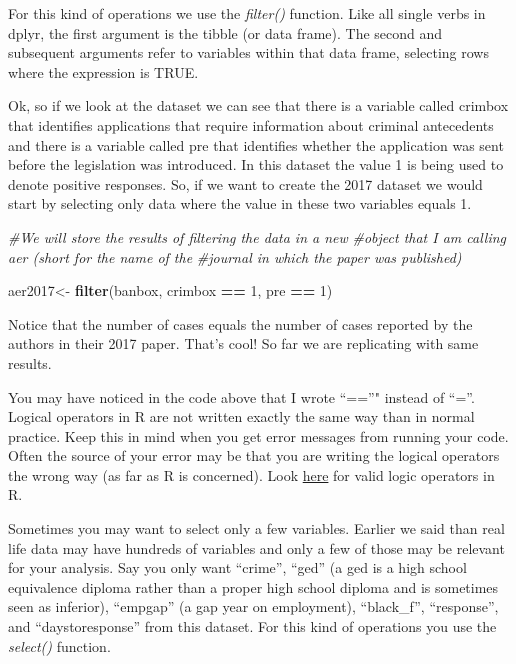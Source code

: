 \documentclass[]{book}
\newenvironment{Shaded}{\begin{snugshade}}{\end{snugshade}}
\newcommand{\CommentTok}[1]{\textcolor[rgb]{0.56,0.35,0.01}{\textit{#1}}}
\newcommand{\DecValTok}[1]{\textcolor[rgb]{0.00,0.00,0.81}{#1}}
\newcommand{\KeywordTok}[1]{\textcolor[rgb]{0.13,0.29,0.53}{\textbf{#1}}}
\newcommand{\NormalTok}[1]{#1}
\newcommand{\OperatorTok}[1]{\textcolor[rgb]{0.81,0.36,0.00}{\textbf{#1}}}
\newcommand{\StringTok}[1]{\textcolor[rgb]{0.31,0.60,0.02}{#1}}
\theoremstyle{definition}
\theoremstyle{definition}
\theoremstyle{definition}
\theoremstyle{remark}
\begin{document}
For this kind of operations we use the \emph{filter()} function. Like
all single verbs in dplyr, the first argument is the tibble (or data
frame). The second and subsequent arguments refer to variables within
that data frame, selecting rows where the expression is TRUE.

Ok, so if we look at the dataset we can see that there is a variable
called crimbox that identifies applications that require information
about criminal antecedents and there is a variable called pre that
identifies whether the application was sent before the legislation was
introduced. In this dataset the value 1 is being used to denote positive
responses. So, if we want to create the 2017 dataset we would start by
selecting only data where the value in these two variables equals 1.

\begin{Shaded}
\begin{Highlighting}[]
\CommentTok{#We will store the results of filtering the data in a new }
\CommentTok{#object that I am calling aer (short for the name of the }
\CommentTok{#journal in which the paper was published)}

\NormalTok{aer2017<-}\StringTok{ }\KeywordTok{filter}\NormalTok{(banbox, crimbox }\OperatorTok{==}\StringTok{ }\DecValTok{1}\NormalTok{, pre }\OperatorTok{==}\StringTok{ }\DecValTok{1}\NormalTok{)}
\end{Highlighting}
\end{Shaded}

Notice that the number of cases equals the number of cases reported by
the authors in their 2017 paper. That's cool! So far we are replicating
with same results.

You may have noticed in the code above that I wrote ``==''" instead of
``=''. Logical operators in R are not written exactly the same way than
in normal practice. Keep this in mind when you get error messages from
running your code. Often the source of your error may be that you are
writing the logical operators the wrong way (as far as R is concerned).
Look \href{https://www.statmethods.net/management/operators.html}{here}
for valid logic operators in R.

Sometimes you may want to select only a few variables. Earlier we said
than real life data may have hundreds of variables and only a few of
those may be relevant for your analysis. Say you only want ``crime'',
``ged'' (a ged is a high school equivalence diploma rather than a proper
high school diploma and is sometimes seen as inferior), ``empgap'' (a
gap year on employment), ``black\_f'', ``response'', and
``daystoresponse'' from this dataset. For this kind of operations you
use the \emph{select()} function.
\end{document}
